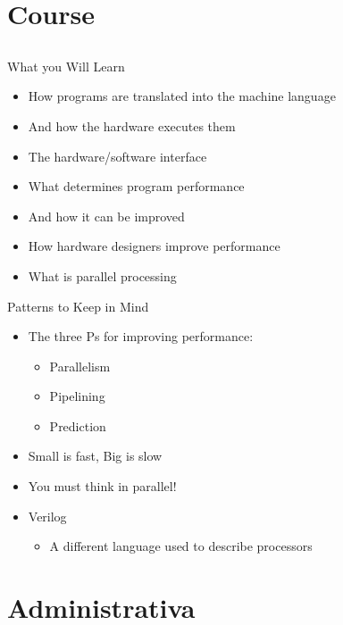 \documentclass{beamer}
\begin{document}
\section{Course}
\subsection{}
\begin{frame}{What you Will Learn}
\begin{itemize}
\item How programs are translated into the machine language
\item And how the hardware executes them
\item The hardware/software interface
\item What determines program performance
\item And how it can be improved
\item How hardware designers improve performance
\item What is parallel processing
\end{itemize}
\end{frame}

\begin{frame}{Patterns to Keep in Mind}
\begin{itemize}
\item The three Ps for improving performance:
\begin{itemize}
\item Parallelism
\item Pipelining
\item Prediction
\end{itemize}
\item Small is fast, Big is slow
\item You must think in parallel!
\item Verilog
\begin{itemize}
\item A different language used to describe processors
\end{itemize}
\end{itemize}
\end{frame}


\section{Administrativa}
\end{document}
